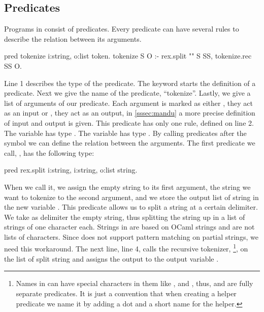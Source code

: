 \documentclass[thesis.tex]{subfiles}
\begin{document}
{{\subsection{Predicates} \label{sssec:predicates}
Programs in \elpi consist of predicates. Every predicate can have several rules to describe the relation between its arguments.
\begin{elpicode}
  pred tokenize i:string, o:list token.
  tokenize S O :- 
    rex.split "" S SS,
    tokenize.rec SS O.
\end{elpicode}
Line 1 describes the type of the predicate. The keyword  starts the definition of a predicate. Next we give the name of the predicate, ``tokenize''. Lastly, we give a list of arguments of our predicate. Each argument is marked as either , they act as an input or , they act as an output, in \cref{sssec:mandu} a more precise definition of input and output is given. This predicate has only one rule, defined on line 2. The variable  has type . The variable  has type . By calling predicates after the \elpii{:-} symbol we can define the relation between the arguments. The first predicate we call, , has the following type:
\begin{elpicode}
  pred rex.split i:string, i:string, o:list string.
\end{elpicode}
When we call it, we assign the empty string to its first argument, the string we want to tokenize to the second argument, and we store the output list of string in the new variable . This predicate allows us to split a string at a certain delimiter. We take as delimiter the empty string, thus splitting the string up in a list of strings of one character each. Strings in \elpi are based on OCaml strings and are not lists of characters. Since \elpi does not support pattern matching on partial strings, we need this workaround. The next line, line 4, calls the recursive tokenizer, \footnote{Names in \elpi can have special characters in them like , \elpii{-} and \elpii{>}, thus,  and  are fully separate predicates. It is just a convention that when creating a helper predicate we name it by adding a dot and a short name for the helper.}, on the list of split string and assigns the output to the output variable .

}}
\end{document}
